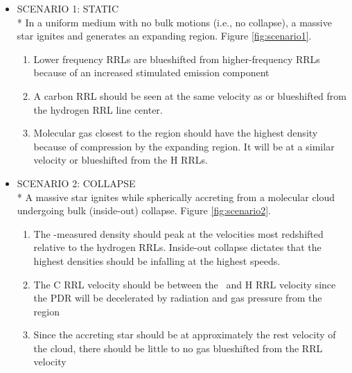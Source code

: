 \begin{itemize}
    \item SCENARIO 1: STATIC
        \\* In a uniform medium with no bulk motions (i.e., no collapse), a massive star
      ignites and generates an expanding  region.  Figure \ref{fig:scenario1}.

  \begin{enumerate}
    \item Lower frequency RRLs are blueshifted from higher-frequency RRLs
      because of an increased stimulated emission component \citep{Lockman1978}
    \item A carbon RRL should be seen at the same velocity as or blueshifted from
      the hydrogen RRL line center. 
    \item Molecular gas closest to the  region should have the
      highest density because of compression by the expanding 
      region.  It will be at a similar velocity or blueshifted from the H RRLs.
\end{enumerate}


  \item SCENARIO 2: COLLAPSE
      \\* A massive star ignites while spherically accreting from a
    molecular cloud undergoing bulk (inside-out) collapse.  Figure \ref{fig:scenario2}.

  \begin{enumerate}
    \item The \formaldehyde-measured density should peak at the velocities
      most redshifted relative to the hydrogen RRLs.  Inside-out collapse
      dictates that the highest densities should be infalling at the highest
      speeds.
    \item The C RRL velocity should be between the \formaldehyde\ and H RRL
      velocity since the PDR will be decelerated by radiation and gas pressure
      from the  region
    \item Since the accreting star should be at approximately the rest
      velocity of the cloud, there should be little to no gas blueshifted from
      the RRL velocity
\end{enumerate}


\end{itemize}
